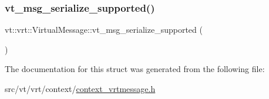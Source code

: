 \mbox{\label{structvt_1_1vrt_1_1_virtual_message_a4d91471760fc7b86e84a91f54596b1bd}} 
\subsubsection{\texorpdfstring{vt\+\_\+msg\+\_\+serialize\+\_\+supported()}{vt\_msg\_serialize\_supported()}}
{\footnotesize\ttfamily vt\+::vrt\+::\+Virtual\+Message\+::vt\+\_\+msg\+\_\+serialize\+\_\+supported (\begin{DoxyParamCaption}{ }\end{DoxyParamCaption})}



The documentation for this struct was generated from the following file\+:\begin{DoxyCompactItemize}
\item 
src/vt/vrt/context/\hyperlink{context__vrtmessage_8h}{context\+\_\+vrtmessage.\+h}\end{DoxyCompactItemize}
